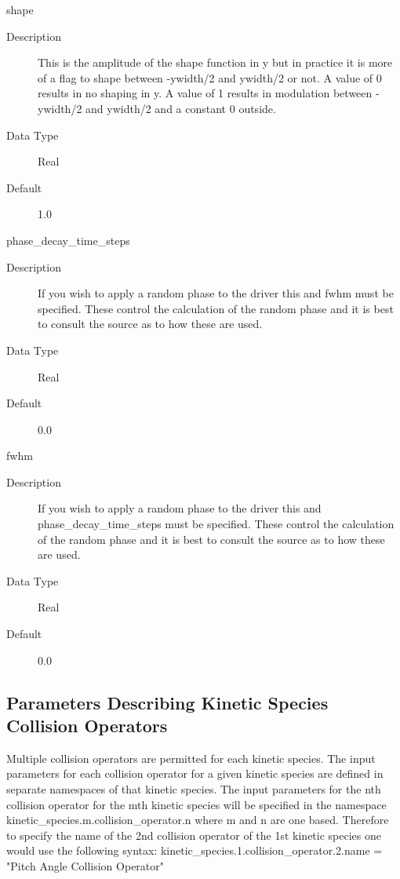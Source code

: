 \documentclass[11pt]{amsart}
\begin{document}
shape
\begin{description}
\item [Description] This is the amplitude of the shape function in y but in
practice it is more of a flag to shape between -ywidth/2 and ywidth/2 or
not.  A value of 0 results in no shaping in y.  A value of 1 results in
modulation between -ywidth/2 and ywidth/2 and a constant 0 outside.
\item [Data Type] Real
\item [Default] 1.0
\end{description}

phase\_decay\_time\_steps
\begin{description}
\item [Description] If you wish to apply a random phase to the driver this and
fwhm must be specified.  These control the calculation of the random phase
and it is best to consult the source as to how these are used.
\item [Data Type] Real
\item [Default] 0.0
\end{description}

fwhm
\begin{description}
\item [Description] If you wish to apply a random phase to the driver this and \\
phase\_decay\_time\_steps must be specified.  These control the calculation
of the random phase and it is best to consult the source as to how these are
used.
\item [Data Type] Real
\item [Default] 0.0
\end{description}

\subsection*{Parameters Describing Kinetic Species Collision Operators}
Multiple collision operators are permitted for each kinetic species.  The input
parameters for each collision operator for a given kinetic species are defined
in separate namespaces of that kinetic species.  The input parameters for the
nth collision operator for the mth kinetic species will be specified in the
namespace kinetic\_species.m.collision\_operator.n where m and n are one based.
Therefore to specify the name of the 2nd collision operator of the 1st kinetic
species one would use the following syntax:
kinetic\_species.1.collision\_operator.2.name = "Pitch Angle Collision Operator"
\end{document}
